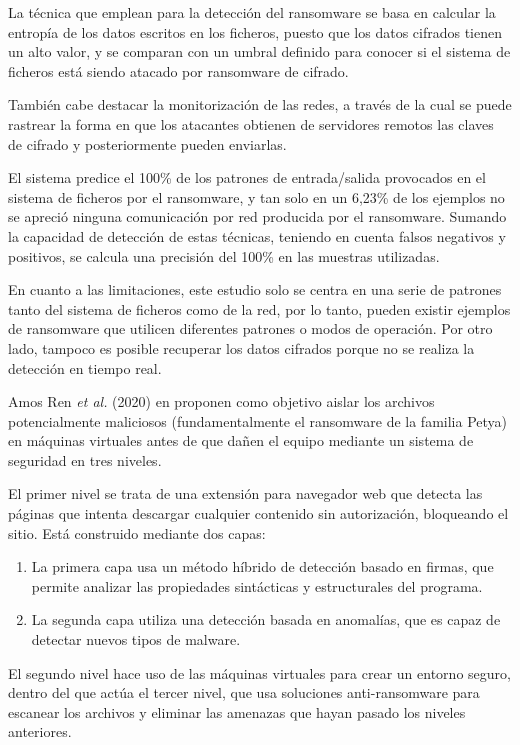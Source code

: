 La técnica que emplean para la detección del ransomware se basa en calcular la entropía de los datos escritos en los ficheros, puesto que los datos cifrados tienen un alto valor, y se comparan con un umbral definido para conocer si el sistema de ficheros está siendo atacado por ransomware de cifrado.

También cabe destacar la monitorización de las redes, a través de la cual se puede rastrear la forma en que los atacantes obtienen de servidores remotos las claves de cifrado y posteriormente pueden enviarlas. 

El sistema predice el 100\% de los patrones de entrada/salida provocados en el sistema de ficheros por el ransomware, y tan solo en un 6,23\% de los ejemplos no se apreció ninguna comunicación por red producida por el ransomware. Sumando la capacidad de detección de estas técnicas, teniendo en cuenta falsos negativos y positivos, se calcula una precisión del 100\% en las muestras utilizadas.

En cuanto a las limitaciones, este estudio solo se centra en una serie de patrones tanto del sistema de ficheros como de la red, por lo tanto, pueden existir ejemplos de ransomware que utilicen diferentes patrones o modos de operación. Por otro lado, tampoco es posible recuperar los datos cifrados porque no se realiza la detección en tiempo real.

Amos Ren \textit{et al.} (2020) en \cite{Ren2020} proponen como objetivo aislar los archivos potencialmente maliciosos (fundamentalmente el ransomware de la familia Petya) en máquinas virtuales antes de que dañen el equipo mediante un sistema de seguridad en tres niveles. 

El primer nivel se trata de una extensión para navegador web que detecta las páginas que intenta descargar cualquier contenido sin autorización, bloqueando el sitio. Está construido mediante dos capas:
\begin{enumerate}
    \item La primera capa usa un método híbrido de detección basado en firmas, que permite analizar las propiedades sintácticas y estructurales del programa.
    \item La segunda capa utiliza una detección basada en anomalías, que es capaz de detectar nuevos tipos de malware.
\end{enumerate}

El segundo nivel hace uso de las máquinas virtuales para crear un entorno seguro, dentro del que actúa el tercer nivel, que usa soluciones anti-ransomware para escanear los archivos y eliminar las amenazas que hayan pasado los niveles anteriores.

